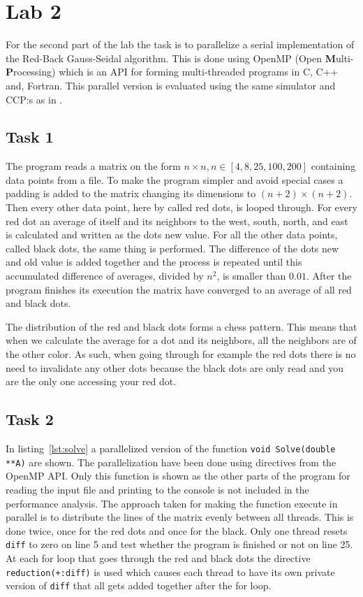 \section{Lab 2}
\label{sec:lab2}
For the second part of the lab the task is to parallelize a serial implementation of the Red-Back Gauss-Seidal algorithm. This is done using OpenMP (Open \textbf Multi-\textbf Processing) which is an API for forming multi-threaded programs in C, C++ and, Fortran. This parallel version is evaluated using the same simulator and CCP:s as in . 

\subsection{Task 1}
The program reads a matrix on the form $n \times n, n \in [4,8,25,100,200]$ containing data points from a file. To make the program simpler and avoid special cases a padding is added to the matrix changing its dimensions to $(n+2) \times (n+2)$. Then every other data point, here by called red dots, is looped through. For every red dot an average of itself and its neighbors to the west, south, north, and east is calculated and written as the dots new value. For all the other data points, called black dots, the same thing is performed. The difference of the dots new and old value is added together and the process is repeated until this accumulated difference of averages, divided by $n^2$, is smaller than $0.01$. After the program finishes its execution the matrix have converged to an average of all red and black dots.

The distribution of the red and black dots forms a chess pattern. This means that when we calculate the average for a dot and its neighbors, all the neighbors are of the other color. As such, when going through for example the red dots there is no need to invalidate any other dots because the black dots are only read and you are the only one accessing your red dot.

\subsection{Task 2}
In listing~\ref{lst:solve} a parallelized version of the function \texttt{void Solve(double **A)} are shown. The parallelization have been done using directives from the OpenMP API. Only this function is shown as the other parts of the program for reading the input file and printing to the console is not included in the performance analysis. The approach taken for making the function execute in parallel is to distribute the lines of the matrix evenly between all threads. This is done twice, once for the red dots and once for the black. Only one thread resets \texttt{diff} to zero on line 5 and test whether the program is finished or not on line 25. At each for loop that goes through the red and black dots the directive \texttt{reduction(+:diff)} is used which causes each thread to have its own private version of \texttt{diff} that all gets added together after the for loop.

